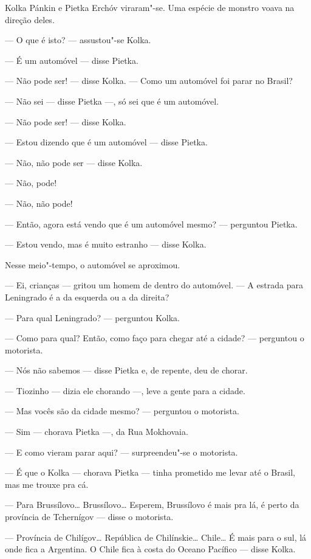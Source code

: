 Kolka Pánkin e Pietka Erchóv viraram"-se. Uma espécie de monstro voava na
direção deles.

--- O que é isto? --- assustou"-se Kolka.

--- É um automóvel --- disse Pietka.

--- Não pode ser! --- disse Kolka. --- Como um automóvel foi parar no
Brasil?

--- Não sei --- disse Pietka ---, só sei que é um automóvel.

--- Não pode ser! --- disse Kolka.

--- Estou dizendo que é um automóvel --- disse Pietka.

--- Não, não pode ser --- disse Kolka.

--- Não, pode!

--- Não, não pode!

--- Então, agora está vendo que é um automóvel mesmo? --- perguntou
Pietka.

--- Estou vendo, mas é muito estranho --- disse Kolka.

Nesse meio"-tempo, o automóvel se aproximou.

--- Ei, crianças --- gritou um homem de dentro do automóvel. --- A
estrada para Leningrado é a da esquerda ou a da direita?

--- Para qual Leningrado? --- perguntou Kolka.

--- Como para qual? Então, como faço para chegar até a cidade? ---
perguntou o motorista.

--- Nós não sabemos --- disse Pietka e, de repente, deu de chorar.

--- Tiozinho --- dizia ele chorando ---, leve a gente para a cidade.

--- Mas vocês são da cidade mesmo? --- perguntou o motorista.

--- Sim --- chorava Pietka ---, da Rua Mokhovaia.

--- E como vieram parar aqui? --- surpreendeu"-se o motorista.

--- É que o Kolka --- chorava Pietka --- tinha prometido me levar até o
Brasil, mas me trouxe pra cá.

--- Para Brussílovo\ldots{} Brussílovo\ldots{} Esperem, Brussílovo é mais pra lá,
é perto da província de Tchernígov --- disse o motorista.

--- Província de Chilígov\ldots{} República de Chilínskie\ldots{} Chile\ldots{} É mais
para o sul, lá onde fica a Argentina. O Chile fica à costa do Oceano
Pacífico --- disse Kolka.

